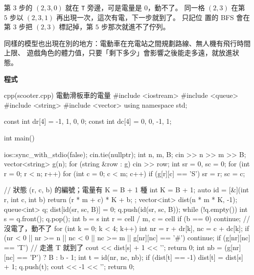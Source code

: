 第 $3$ 步的 $(2, 3, 0)$ 就在 \texttt{T} 旁邊，可是電量是 $0$，動不了。 同一格
$(2, 3)$ 在第 $5$ 步以 $(2, 3, 1)$ 再出現一次，這次有電，下一步就到了。 只記位
置的 BFS 會在第 $3$ 步把 $(2, 3)$ 標記掉，第 $5$ 步那次就進不了佇列。

同樣的模型也出現在別的地方：電動車在充電站之間規劃路線、無人機有飛行時間上限、
遊戲角色的體力值，只要「剩下多少」會影響之後能走多遠，就放進狀態。

\textbf{程式}

\begin{example}[label=ex:scooter]{cpp}{(scooter.cpp) 電動滑板車的電量}
#include <iostream>
#include <queue>
#include <string>
#include <vector>
using namespace std;

const int dr[4] = {-1, 1, 0, 0};
const int dc[4] = {0, 0, -1, 1};

int main() {
    ios::sync_with_stdio(false);
    cin.tie(nullptr);
    int n, m, B;
    cin >> n >> m >> B;
    vector<string> g(n);
    for (string &row : g) {
        cin >> row;
    }
    int sr = 0, sc = 0;
    for (int r = 0; r < n; r++) {
        for (int c = 0; c < m; c++) {
            if (g[r][c] == 'S') {
                sr = r;
                sc = c;
            }
        }
    }

    // 狀態 (r, c, b) 的編號；電量有 K = B + 1 種
    int K = B + 1;
    auto id = [&](int r, int c, int b) {
        return (r * m + c) * K + b;
    };
    vector<int> dist(n * m * K, -1);
    queue<int> q;
    dist[id(sr, sc, B)] = 0;
    q.push(id(sr, sc, B));
    while (!q.empty()) {
        int s = q.front();
        q.pop();
        int b = s %
        int r = cell / m, c = cell %
        if (b == 0) {
            continue;                         // 沒電了，動不了
        }
        for (int k = 0; k < 4; k++) {
            int nr = r + dr[k], nc = c + dc[k];
            if (nr < 0 || nr >= n || nc < 0 || nc >= m ||
                g[nr][nc] == '#') {
                continue;
            }
            if (g[nr][nc] == 'T') {           // 走進 T 就到了
                cout << dist[s] + 1 << '\n';
                return 0;
            }
            int nb = (g[nr][nc] == 'P') ? B : b - 1;
            int t = id(nr, nc, nb);
            if (dist[t] == -1) {
                dist[t] = dist[s] + 1;
                q.push(t);
            }
        }
    }
    cout << -1 << '\n';
    return 0;
}
\end{example}


